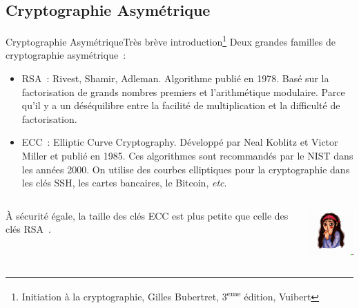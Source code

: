 \documentclass{beamer}
\begin{document}
    \subsection{Cryptographie Asymétrique}\label{subsec:cryptographie-asymetrique}
    \begin{frame}{Cryptographie Asymétrique}{Très brève introduction\footnote{Initiation à la cryptographie, Gilles Bubertret, 3\textsuperscript{eme} édition, Vuibert}}
        Deux grandes familles de cryptographie asymétrique~:
        \begin{itemize}
            \item RSA~: Rivest, Shamir, Adleman.
            Algorithme publié en 1978.
            Basé sur la factorisation de grands nombres premiers et l'arithmétique modulaire.
            Parce qu'il y a un déséquilibre entre la facilité de multiplication et la difficulté de factorisation.
            \item ECC~: Elliptic Curve Cryptography.
            Développé par Neal Koblitz et Victor Miller et publié en 1985.
            Ces algorithmes sont recommandés par le NIST dans les années 2000.
            On utilise des courbes elliptiques pour la cryptographie dans les clés SSH, les cartes bancaires, le Bitcoin, \textit{etc}.
        \end{itemize}
        \begin{columns}
            \begin{column}{0.8\textwidth}
                À sécurité égale, la taille des clés ECC est plus petite que celle des clés RSA~.
            \end{column}
            \begin{column}{0.2\textwidth}
                \centering
                \includegraphics[width=2cm]{image/girl-hiding-a-secret}
            \end{column}
        \end{columns}
    \end{frame}
\end{document}
